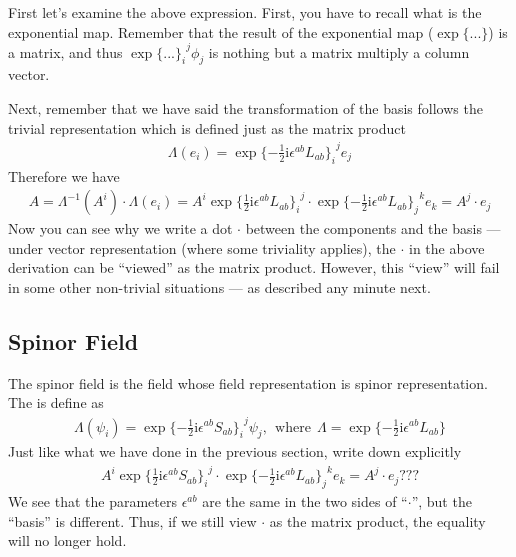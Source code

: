 \documentclass[letterpaper,10pt,english]{sphinxmanual}
\begin{document}
First let's examine the above expression. First, you have to recall what is the exponential map. Remember that the result of the exponential map (\(\exp\{...\}\)) is a matrix, and thus \(\exp\{...{\}_i}^j\phi_j\) is nothing but a matrix multiply a column vector.

Next, remember that we have said the transformation of the basis follows the trivial representation which is defined just as the matrix product
\begin{equation*}
\begin{split}\varLambda(e_i) = \exp\{-\frac{1}{2}\mathrm{i}\epsilon^{ab}L_{ab}{\}_i}^je_j\end{split}
\end{equation*}
Therefore we have
\begin{equation*}
\begin{split}A = \varLambda^{-1}(A^i)\cdot\varLambda(e_i) = A^i \exp\{\frac{1}{2}\mathrm{i}\epsilon^{ab}L_{ab}{\}_i}^j \cdot \exp\{-\frac{1}{2}\mathrm{i}\epsilon^{ab}L_{ab}{\}_j}^k e_k = A^j\cdot e_j\end{split}
\end{equation*}
Now you can see why we write a dot \(\cdot\) between the components and the basis --- under vector representation (where some triviality applies), the \(\cdot\) in the above derivation can be ``viewed'' as the matrix product. However, this ``view'' will fail in some other non-trivial situations --- as described any minute next.


\subsection{Spinor Field}
\label{\detokenize{field:spinor-field}}
The spinor field is the field whose field representation is spinor representation. The  is define as
\begin{equation*}
\begin{split}\varLambda(\psi_i) = \exp\{-\frac{1}{2}\mathrm{i}\epsilon^{ab}S_{ab}{\}_i}^j\psi_j, \ \ \text{where}\ \ \varLambda = \exp\{-\frac{1}{2}\mathrm{i}\epsilon^{ab}L_{ab}\}\end{split}
\end{equation*}
Just like what we have done in the previous section, write down explicitly
\begin{equation*}
\begin{split}A^i \exp\{\frac{1}{2}\mathrm{i}\epsilon^{ab}S_{ab}{\}_i}^j \cdot \exp\{-\frac{1}{2}\mathrm{i}\epsilon^{ab}L_{ab}{\}_j}^k e_k =  A^j\cdot e_j ???\end{split}
\end{equation*}
We see that the parameters \(\epsilon^{ab}\) are the same in the two sides of “\(\cdot\)”, but the ``basis'' is different. Thus, if we still view \(\cdot\) as the matrix product, the equality will no longer hold.
\end{document}
